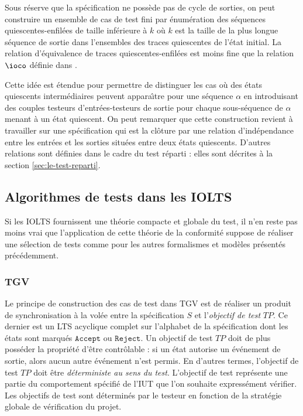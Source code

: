 Sous r\'eserve que la sp\'ecification ne poss\`ede pas de cycle de
sorties, on peut construire  un ensemble de cas de test fini par
\'enum\'eration des s\'equences quiescentes-enfil\'ees de taille
inf\'erieure \`a $k$ o\`u $k$ est la taille de la plus longue
s\'equence de sortie dans l'ensembles des traces quiescentes de
l'\'etat initial. La relation
d'\'equivalence de traces quiescentes-enfil\'ees est moins fine que
la relation $\ioco$ d\'efinie dans \cite{auto-test-fm}.

Cette id\'ee est \'etendue pour permettre de distinguer les cas
o\`u des \'etats quiescents interm\'ediaires peuvent appara\^{\i}tre
pour une s\'equence $\alpha$ en introduisant des couples testeurs
d'entr\'ees-testeurs de sortie pour chaque sous-s\'equence de
$\alpha$ menant \`a un \'etat quiescent. On peut remarquer que cette
construction revient \`a travailler sur une sp\'ecification qui est
la cl\^oture par une relation d'ind\'ependance entre les entr\'ees
et les sorties situ\'ees entre deux \'etats quiescents. 
D'autres relations sont d\'efinies dans le cadre du test r\'eparti :
elles sont d\'ecrites \`a la section \ref{sec:le-test-reparti}. 

\subsection{Algorithmes de tests dans les \textsf{IOLTS} }

Si les \textsf{IOLTS} fournissent une th\'eorie compacte et globale du test,
il n'en reste pas moins vrai que l'application de cette th\'eorie de
la conformit\'e suppose de r\'ealiser une s\'election de tests
comme pour les autres formalismes et mod\`eles pr\'esent\'es pr\'ec\'edemment.

\subsubsection{TGV}
\label{sec:tgv}
Le principe de construction des cas de test dans TGV\cite{tgv} est de
r\'ealiser un produit de synchronisation \`a la vol\'ee entre la
sp\'ecification $S$ et l'\emph{objectif de test} $TP$. Ce dernier est un \textsf{LTS}
acyclique complet sur l'alphabet de la sp\'ecification dont les \'etats sont
marqu\'es $\mathtt{Accept}$ ou $\mathtt{Reject}$.  Un
objectif  de test $TP$ doit de plus poss\'eder la propri\'et\'e d'\^etre
contr\^olable : si un \'etat autorise un \'ev\'enement de sortie,
alors aucun autre \'ev\'enement n'est permis. En d'autres termes,
l'objectif de test $TP$ doit \^etre \emph{d\'eterministe au sens du
  test}. L'objectif de test repr\'esente une partie du comportement
sp\'ecifi\'e de l'IUT que l'on souhaite express\'ement
v\'erifier. Les objectifs de test sont d\'etermin\'es par le
testeur en fonction de la strat\'egie globale de v\'erification du projet.

